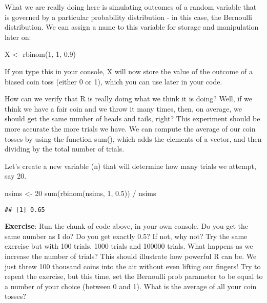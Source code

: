 \documentclass[
]{book}
\newenvironment{Shaded}{\begin{snugshade}}{\end{snugshade}}
\newcommand{\DecValTok}[1]{\textcolor[rgb]{0.00,0.00,0.81}{#1}}
\newcommand{\FloatTok}[1]{\textcolor[rgb]{0.00,0.00,0.81}{#1}}
\newcommand{\FunctionTok}[1]{\textcolor[rgb]{0.00,0.00,0.00}{#1}}
\newcommand{\NormalTok}[1]{#1}
\newcommand{\OtherTok}[1]{\textcolor[rgb]{0.56,0.35,0.01}{#1}}
\newcommand{\SpecialCharTok}[1]{\textcolor[rgb]{0.00,0.00,0.00}{#1}}
\begin{document}
What we are really doing here is simulating outcomes of a random variable that is governed by a particular probability distribution - in this case, the Bernoulli distribution. We can assign a name to this variable for storage and manipulation later on:

\begin{Shaded}
\begin{Highlighting}[]
\NormalTok{X }\OtherTok{\textless{}{-}} \FunctionTok{rbinom}\NormalTok{(}\DecValTok{1}\NormalTok{, }\DecValTok{1}\NormalTok{, }\FloatTok{0.9}\NormalTok{)}
\end{Highlighting}
\end{Shaded}

If you type this in your console, X will now store the value of the outcome of a biased coin toss (either 0 or 1), which you can use later in your code.

How can we verify that R is really doing what we think it is doing? Well, if we think we have a fair coin and we throw it many times, then, on average, we should get the same number of heads and tails, right? This experiment should be more accurate the more trials we have. We can compute the average of our coin tosses by using the function sum(), which adds the elements of a vector, and then dividing by the total number of trials.

Let's create a new variable (n) that will determine how many trials we attempt, say 20.

\begin{Shaded}
\begin{Highlighting}[]
\NormalTok{nsims }\OtherTok{\textless{}{-}} \DecValTok{20}
\FunctionTok{sum}\NormalTok{(}\FunctionTok{rbinom}\NormalTok{(nsims, }\DecValTok{1}\NormalTok{, }\FloatTok{0.5}\NormalTok{)) }\SpecialCharTok{/}\NormalTok{ nsims}
\end{Highlighting}
\end{Shaded}

\begin{verbatim}
## [1] 0.65
\end{verbatim}

\textbf{Exercise}: Run the chunk of code above, in your own console. Do you get the same number as I do? Do you get exactly 0.5? If not, why not? Try the same exercise but with 100 trials, 1000 trials and 100000 trials. What happens as we increase the number of trials? This should illustrate how powerful R can be. We just threw 100 thousand coins into the air without even lifting our fingers! Try to repeat the exercise, but this time, set the Bernoulli prob parameter to be equal to a number of your choice (between 0 and 1). What is the average of all your coin tosses?
\end{document}
